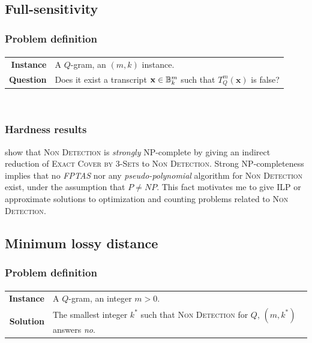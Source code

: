 \subsection{Full-sensitivity}
\label{sub:qgram-full-sensitivity}


\subsubsection{Problem definition}

\paragraph{}
\begin{tabular}{rl}
{\bf Instance}	&	A $Q$-gram, an $(m,k)$ instance. \\
{\bf Question}	&	Does it exist a transcript $\mathbf{x} \in \mathbb {B}^{m}_{k}$ such that $T_{Q}^{m}(\mathbf{x})$ is false? \\
\end{tabular}
\\

\subsubsection{Hardness results}

\cite{Nicolas2005} show that \textsc{Non Detection} is \emph{strongly} NP-complete by giving an indirect reduction of \textsc{Exact Cover by 3-Sets} to \textsc{Non Detection}.
Strong NP-completeness implies that no \emph{FPTAS} nor any \emph{pseudo-polynomial} algorithm for \textsc{Non Detection} exist, under the assumption that $P \neq NP$.
This fact motivates me to give ILP or approximate solutions to optimization and counting problems related to \textsc{Non Detection}.

\subsection{Minimum lossy distance}
\label{sub:qgram-min-lossy-distance}

\subsubsection{Problem definition}

\paragraph{}
\begin{tabular}{rl}
{\bf Instance}	&	A $Q$-gram, an integer $m > 0$.\\
{\bf Solution}	&	The smallest integer $k^*$ such that \textsc{Non Detection} for $Q$, $(m,k^*)$ answers \emph{no}.\\
\end{tabular}
\\

